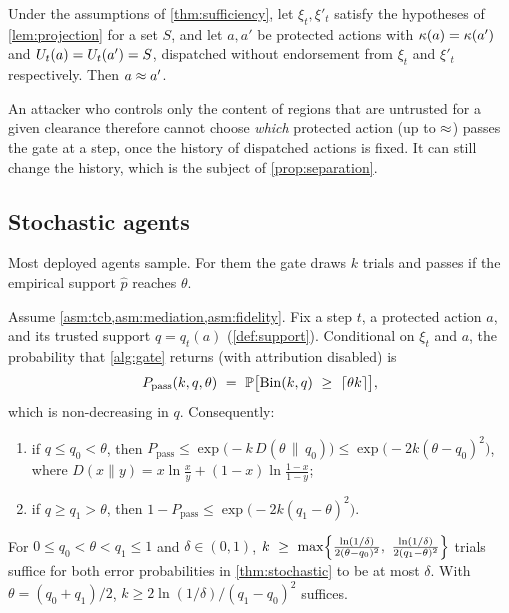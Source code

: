 \begin{corollary}\label{cor:ni}
Under the assumptions of \cref{thm:sufficiency}, let $\xi_t,\xi'_t$ satisfy the hypotheses of \cref{lem:projection} for a set $S$, and let $a,a'$ be protected actions with $\kappa(a)=\kappa(a')$ and $U_t(a)=U_t(a')=S$, dispatched without endorsement from $\xi_t$ and $\xi'_t$ respectively. Then $a\approx a'$.
\end{corollary}

An attacker who controls only the content of regions that are untrusted for a given clearance therefore cannot choose \emph{which} protected action (up to $\approx$) passes the gate at a step, once the history of dispatched actions is fixed. It can still change the history, which is the subject of \cref{prop:separation}.

\subsection{Stochastic agents}

Most deployed agents sample. For them the gate draws $k$ trials and passes if the empirical support $\hat p$ reaches $\theta$.

\begin{theorem}\label{thm:stochastic}
Assume \cref{asm:tcb,asm:mediation,asm:fidelity}. Fix a step $t$, a protected action $a$, and its trusted support $q=q_t(a)$ (\cref{def:support}). Conditional on $\xi_t$ and $a$, the probability that \cref{alg:gate} returns \PASS{} (with attribution disabled) is
\begin{equation}\label{eq:binom}
  P_{\mathrm{pass}}(k,q,\theta)\ =\ \Prob\bigl[\Bin(k,q)\ \ge\ \lceil\theta k\rceil\bigr],
\end{equation}
which is non-decreasing in $q$. Consequently:
\begin{enumerate}[label=(\roman*)]
  \item if $q\le q_0<\theta$, then $P_{\mathrm{pass}}\le\exp\bigl(-k\,D(\theta\,\|\,q_0)\bigr)\le\exp\bigl(-2k(\theta-q_0)^2\bigr)$, where $D(x\|y)=x\ln\frac{x}{y}+(1-x)\ln\frac{1-x}{1-y}$;
  \item if $q\ge q_1>\theta$, then $1-P_{\mathrm{pass}}\le\exp\bigl(-2k(q_1-\theta)^2\bigr)$.
\end{enumerate}
\end{theorem}

\begin{corollary}\label{cor:trials}
For $0\le q_0<\theta<q_1\le1$ and $\delta\in(0,1)$, $k\ \ge\ \max\Bigl\{\frac{\ln(1/\delta)}{2(\theta-q_0)^2},\ \frac{\ln(1/\delta)}{2(q_1-\theta)^2}\Bigr\}$ trials suffice for both error probabilities in \cref{thm:stochastic} to be at most $\delta$. With $\theta=(q_0+q_1)/2$, $k\ge 2\ln(1/\delta)/(q_1-q_0)^2$ suffices.
\end{corollary}


